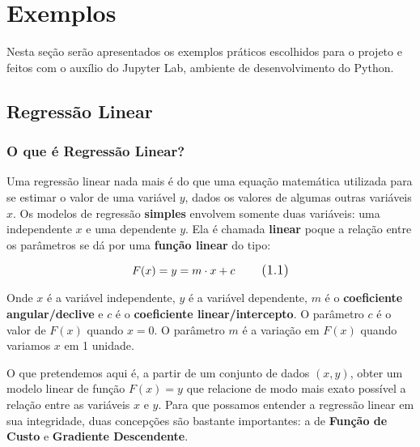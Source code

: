 \chapter{Exemplos}

Nesta seção serão apresentados os exemplos práticos escolhidos para o projeto e feitos com o auxílio do Jupyter Lab, ambiente de desenvolvimento do Python.

\section{Regressão Linear}

\subsection{O que é Regressão Linear?}
\label{sec:wifi}

Uma regressão linear nada mais é do que uma equação matemática utilizada para se estimar o valor de uma variável \(y\), dados os valores de algumas outras variáveis \(x\). Os modelos de regressão \textbf{simples} envolvem somente duas variáveis: uma independente \(x\) e uma dependente \(y\). Ela é chamada \textbf{linear} poque a relação entre os parâmetros se dá por uma \textbf{função linear} do tipo:

\begin{equation}
\large F(x) = y = m \cdot x + c
\tag{1.1} 
\end{equation}

Onde \(x\) é a variável independente, \(y\) é a variável dependente, \(m\) é o \textbf{coeficiente angular/declive} e \(c\) é o \textbf{coeficiente linear/intercepto}. O parâmetro \(c\) é o valor de \(F(x)\) quando \(x = 0\). O parâmetro \(m\) é a variação em \(F(x)\) quando variamos $x$ em 1 unidade.

O que pretendemos aqui é, a partir de um conjunto de dados $(x,y)$, obter um modelo linear de função $F(x) = y$ que relacione de modo mais exato possível a relação entre  as variáveis $x$ e $y$. Para que possamos entender a regressão linear em sua integridade, duas concepções são bastante importantes: a de \textbf{Função de Custo} e \textbf{Gradiente Descendente}. 



